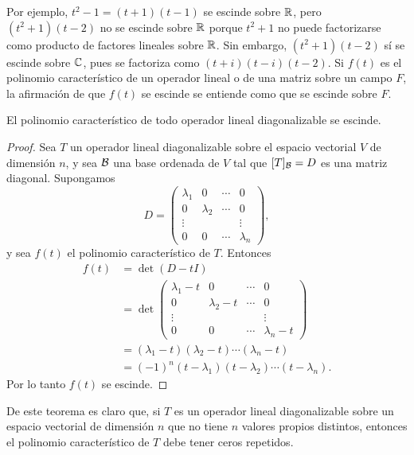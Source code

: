 \documentclass[12pt,a4paper]{book}
\begin{document}
    Por ejemplo, $t^2-1=(t+1)(t-1)$ se escinde sobre $\mathbb{R}$, pero $(t^2+1)(t-2)$ no se escinde sobre $\mathbb{R}$ porque $t^2+1$ no puede factorizarse como producto de factores lineales sobre $\mathbb{R}$. Sin embargo, $(t^2+1)(t-2)$ sí se escinde sobre $\mathbb{C}$, pues se factoriza como $(t+i)(t-i)(t-2)$. Si $f(t)$ es el polinomio característico de un operador lineal o de una matriz sobre un campo $F$, la afirmación de que $f(t)$ se escinde se entiende como que se escinde sobre $F$.

    \begin{teorema}
        El polinomio característico de todo operador lineal diagonalizable se escinde.
    \end{teorema}

    \begin{proof}
        Sea $T$ un operador lineal diagonalizable sobre el espacio vectorial $V$ de dimensión $n$, y sea $\mathcal{B}$ una base ordenada de $V$ tal que $[T]_{\mathcal{B}}=D$ es una matriz diagonal. Supongamos
        \begin{equation*}
            D=\begin{pmatrix}\lambda_1&0&\cdots&0\\0&\lambda_2&\cdots&0\\\vdots&&&\vdots\\0&0&\cdots&\lambda_n\end{pmatrix},
        \end{equation*}
        y sea $f(t)$ el polinomio característico de $T$. Entonces
        \begin{align*}
            f(t)&=\det(D-tI)\\
            &=\det\begin{pmatrix}\lambda_1-t&0&\cdots&0\\0&\lambda_2-t&\cdots&0\\\vdots&&&\vdots\\0&0&\cdots&\lambda_n-t\end{pmatrix}\\
            &=(\lambda_1-t)(\lambda_2-t)\cdots(\lambda_n-t)\\
            &=(-1)^n(t-\lambda_1)(t-\lambda_2)\cdots(t-\lambda_n).
        \end{align*}
        Por lo tanto $f(t)$ se escinde.
    \end{proof}

    De este teorema es claro que, si $T$ es un operador lineal diagonalizable sobre un espacio vectorial de dimensión $n$ que no tiene $n$ valores propios distintos, entonces el polinomio característico de $T$ debe tener ceros repetidos.
\end{document}
